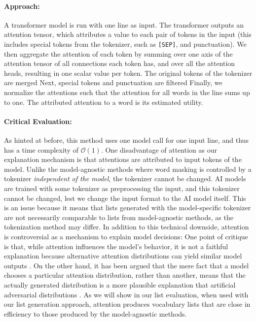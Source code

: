 \paragraph{Approach:}
A transformer model is run with one line as input.
The transformer outputs an attention tensor, which attributes a value to each pair of tokens in the input (this includes special tokens from the tokenizer, such as \texttt{[SEP]}, and punctuation).
We then aggregate the attention of each token by summing over one axis of the attention tensor of all connections each token has, and over all the attention heads, resulting in one scalar value per token.
The original tokens of the tokenizer are merged
Next, special tokens and punctuation are filtered
Finally, we normalize the attentions such that the attention for all words in the line sums up to one.
The attributed attention to a word is its estimated utility.

\paragraph{Critical Evaluation:}
As hinted at before, this method uses one model call for one input line, and thus has a time complexity of $\mathcal{O}(1)$.
One disadvantage of attention as our explanation mechanism is that attentions are attributed to input tokens of the model.
Unlike the model-agnostic methods where word masking is controlled by a tokenizer \textit{independent of the model}, the tokenizer cannot be changed.
AI models are trained with some tokenizer as preprocessing the input, and this tokenizer cannot be changed, lest we change the input format to the AI model itself.
This is an issue because it means that lists generated with the model-specific tokenizer are not necessarily comparable to lists from model-agnostic methods, as the tokenization method may differ.
In addition to this technical downside, attention is controversial as a mechanism to explain model decisions:
One point of critique is that, while attention influences the model's behavior, it is not a faithful explanation because alternative attention distributions can yield similar model outputs \cite{jainAttentionNotExplanation2019}.
On the other hand, it has been argued that the mere fact that a model chooses a particular attention distribution, rather than another, means that the actually generated distribution is a more plausible explanation that artificial adversarial distributions \cite{wiegreffeAttentionNotNot2019}.
As we will show in our list evaluation, when used with our list generation approach, attention produces vocabulary lists that are close in efficiency to those produced by the model-agnostic methods.

